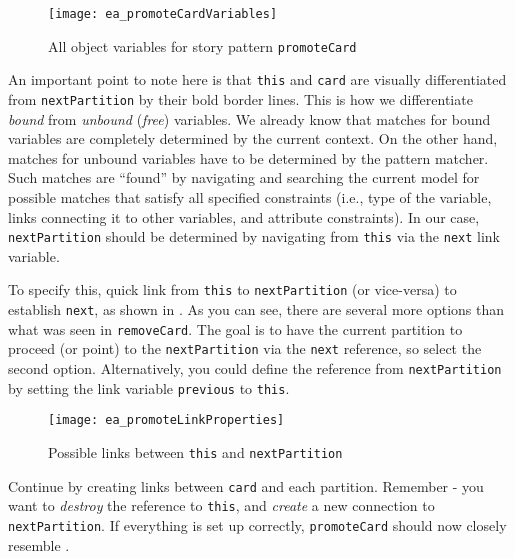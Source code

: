 \begin{stepbystep}
\begin{figure}[htbp]
\begin{center}
  \texttt{[image: ea\_promoteCardVariables]}
  \caption{All object variables for story pattern \texttt{promoteCard}}
  \label{ea:sdm_check_complete_sp}
\end{center}
\end{figure}

An important point to note here is that \texttt{this} and \texttt{card} are visually differentiated from \texttt{nextPartition} by
their bold border lines. This is how we differentiate \emph{bound} from \emph{unbound} (\emph{free}) variables. We already know that matches for bound
variables are completely determined by the current context. On the other hand, matches for unbound variables have to be determined by the pattern matcher. Such
matches are ``found'' by navigating and searching the current model for possible matches that satisfy all specified constraints (i.e., type of the variable,
links connecting it to other variables, and attribute constraints). In our case, \texttt{nextPartition} should be determined by navigating from
\texttt{this} via the \texttt{next} link variable.

\vspace{0.5cm}

\item To specify this, quick link from \texttt{this} to \texttt{nextPartition} (or vice-versa) to establish
\texttt{next}, as shown in . As you can see, there are several more options than what was seen in
\texttt{removeCard}. The goal is to have the current partition to proceed (or point) to the \texttt{nextPartition} via the \texttt{next} reference, so select
the second option. Alternatively, you could define the reference from \texttt{nextPartition} by setting the link variable \texttt{previous} to \texttt{this}.

\begin{figure}[htbp]
\begin{center}
  \texttt{[image: ea\_promoteLinkProperties]}
  \caption{Possible links between \texttt{this} and \texttt{nextPartition}}
  \label{ea:sdm_check_link_variable}
\end{center}
\end{figure}

\vspace{0.5cm}

\item Continue by creating links between \texttt{card} and each partition. Remember - you want to \emph{destroy} the reference to
\texttt{this}, and \emph{create} a new connection to \texttt{nextPartition}. If everything is set up correctly, \texttt{promoteCard} should now closely resemble
.


\end{stepbystep}
